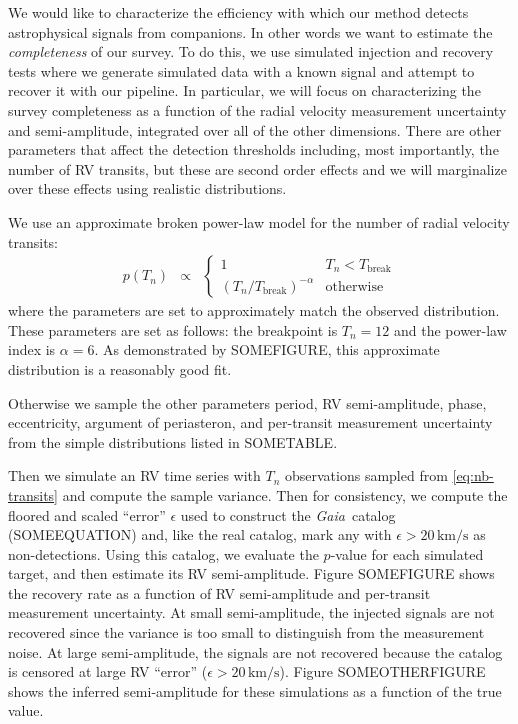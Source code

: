 \documentclass[modern, letterpaper]{aastex631}
\newcommand{\project}[1]{\textsl{#1}}
\newcommand{\Gaia}{\project{Gaia}}
\begin{document}
We would like to characterize the efficiency with which our method detects astrophysical signals from companions.
In other words we want to estimate the \emph{completeness} of our survey.
To do this, we use simulated injection and recovery tests where we generate simulated data with a known signal and attempt to recover it with our pipeline.
In particular, we will focus on characterizing the survey completeness as a function of the radial velocity measurement uncertainty and semi-amplitude, integrated over all of the other dimensions.
There are other parameters that affect the detection thresholds including, most importantly, the number of RV transits, but these are second order effects and we will marginalize over these effects using realistic distributions.

We use an approximate broken power-law model for the number of radial velocity transits:
\begin{eqnarray}
	\label{eq:nb-transits}
	p(T_n) &\propto& \left\{\begin{array}{ll}
	1                                  & T_n < T_\mathrm{break} \\
	(T_n / T_\mathrm{break})^{-\alpha} & \mathrm{otherwise}
	\end{array} \right.
\end{eqnarray}
where the parameters are set to approximately match the observed distribution.
These parameters are set as follows: the breakpoint is $T_n = 12$ and the power-law index is $\alpha = 6$.
As demonstrated by SOMEFIGURE, this approximate distribution is a reasonably good fit.

Otherwise we sample the other parameters period, RV semi-amplitude, phase, eccentricity, argument of periasteron, and per-transit measurement uncertainty from the simple distributions listed in SOMETABLE.

Then we simulate an RV time series with $T_n$ observations sampled from \autoref{eq:nb-transits} and compute the sample variance.
Then for consistency, we compute the floored and scaled ``error'' $\epsilon$ used to construct the \Gaia\ catalog (SOMEEQUATION) and, like the real catalog, mark any with $\epsilon > 20\,\mathrm{km/s}$ as non-detections.
Using this catalog, we evaluate the $p$-value for each simulated target, and then estimate its RV semi-amplitude.
Figure SOMEFIGURE shows the recovery rate as a function of RV semi-amplitude and per-transit measurement uncertainty.
At small semi-amplitude, the injected signals are not recovered since the variance is too small to distinguish from the measurement noise.
At large semi-amplitude, the signals are not recovered because the catalog is censored at large RV ``error'' ($\epsilon > 20\,\mathrm{km/s}$).
Figure SOMEOTHERFIGURE shows the inferred semi-amplitude for these simulations as a function of the true value.
\end{document}
